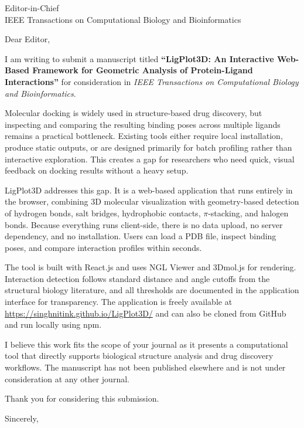 \documentclass[11pt]{letter}
\date{\today}
\begin{document}
\begin{letter}{Editor-in-Chief\\
IEEE Transactions on Computational Biology and Bioinformatics}

\opening{Dear Editor,}

I am writing to submit a manuscript titled \textbf{``LigPlot3D: An Interactive Web-Based Framework for Geometric Analysis of Protein-Ligand Interactions''} for consideration in \textit{IEEE Transactions on Computational Biology and Bioinformatics}.

Molecular docking is widely used in structure-based drug discovery, but inspecting and comparing the resulting binding poses across multiple ligands remains a practical bottleneck. Existing tools either require local installation, produce static outputs, or are designed primarily for batch profiling rather than interactive exploration. This creates a gap for researchers who need quick, visual feedback on docking results without a heavy setup.

LigPlot3D addresses this gap. It is a web-based application that runs entirely in the browser, combining 3D molecular visualization with geometry-based detection of hydrogen bonds, salt bridges, hydrophobic contacts, $\pi$-stacking, and halogen bonds. Because everything runs client-side, there is no data upload, no server dependency, and no installation. Users can load a PDB file, inspect binding poses, and compare interaction profiles within seconds.

The tool is built with React.js and uses NGL Viewer and 3Dmol.js for rendering. Interaction detection follows standard distance and angle cutoffs from the structural biology literature, and all thresholds are documented in the application interface for transparency. The application is freely available at \url{https://singhnitink.github.io/LigPlot3D/} and can also be cloned from GitHub and run locally using npm.

I believe this work fits the scope of your journal as it presents a computational tool that directly supports biological structure analysis and drug discovery workflows. The manuscript has not been published elsewhere and is not under consideration at any other journal.

Thank you for considering this submission.

\closing{Sincerely,}

\end{letter}
\end{document}
